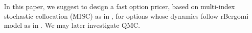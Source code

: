 \documentclass[11pt]{article}
\begin{document}
In this paper, we suggest to design  a fast option pricer, based on multi-index stochastic collocation (MISC) as in \cite{haji2016multi}, for options whose dynamics follow rBergomi model as in \cite{bayer2016pricing}. We may later investigate QMC.




 
\end{document}
